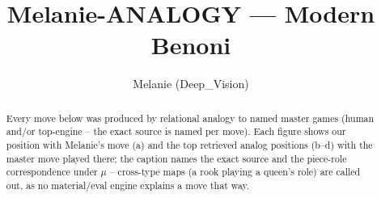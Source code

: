 \documentclass[11pt]{article}
\title{Melanie-ANALOGY — Modern Benoni}
\author{Melanie (Deep\_Vision)}
\date{}
\begin{document}
\maketitle

\begin{abstract}Every move below was produced by relational analogy to named master games (human and/or top-engine -- the exact source is named per move). Each figure shows our position with Melanie's move (a) and the top retrieved analog positions (b--d) with the master move played there; the caption names the exact source and the piece-role correspondence under $\mu$ -- cross-type maps (a rook playing a queen's role) are called out, as no material/eval engine explains a move that way.\end{abstract}

\begin{figure}[p]\centering
\begin{subfigure}{0.46\textwidth}\centering
\resizebox{\linewidth}{!}{%
\newchessgame
\chessboard[
  setfen={rnbqkb1r/pp3p1p/3p1np1/2pP4/4P2P/2N5/PP3PP1/R1BQKBNR b KQkq - 0 7},
  showmover=false,
  pgfstyle=straightmove, color=movearrow, markmove={f8-g7}
]}
\caption{}
\end{subfigure}\hfill
\begin{subfigure}{0.46\textwidth}\centering
\resizebox{\linewidth}{!}{%
\newchessgame
\chessboard[
  setfen={rnbqkb1r/pp3p1p/3p1np1/2pP4/4P3/2NB4/PP3PPP/R1BQK1NR b KQkq - 1 7},
  showmover=false,
  pgfstyle=straightmove, color=movearrow, markmove={f8-g7}
]}
\caption{}
\end{subfigure}
\\[4pt]
\begin{subfigure}{0.46\textwidth}\centering
\resizebox{\linewidth}{!}{%
\newchessgame
\chessboard[
  setfen={rnbqkb1r/pp3p1p/3p1np1/2pP4/4P3/2NB4/PP3PPP/R1BQK1NR b KQkq - 1 7},
  showmover=false,
  pgfstyle=straightmove, color=movearrow, markmove={f8-g7}
]}
\caption{}
\end{subfigure}\hfill
\begin{subfigure}{0.46\textwidth}\centering
\resizebox{\linewidth}{!}{%
\newchessgame
\chessboard[
  setfen={rnbqkb1r/pp3p1p/3p1np1/2pP4/4P3/2NB4/PP3PPP/R1BQK1NR b KQkq - 1 7},
  showmover=false,
  pgfstyle=straightmove, color=movearrow, markmove={f8-g7}
]}
\caption{}
\end{subfigure}

\end{figure}
\end{document}
